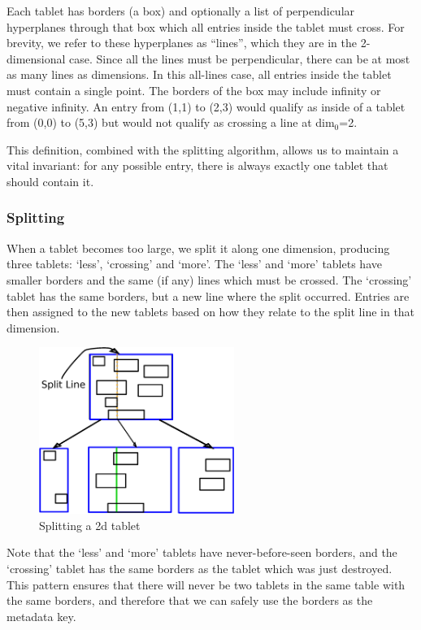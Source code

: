 \documentclass[11pt]{article}
\begin{document}
Each tablet has borders (a box) and optionally a list of perpendicular hyperplanes through that box which all entries inside the tablet must cross.  For brevity, we refer to these hyperplanes as ``lines'', which they are in the 2-dimensional case.   Since all the lines must be perpendicular, there can be at most as many lines as dimensions. In this all-lines case, all entries inside the tablet must contain a single point. The borders of the box may include infinity or negative infinity. An entry from (1,1) to (2,3) would qualify as inside of a tablet from (0,0) to (5,3) but would not qualify as crossing a line at dim$_0$=2.

This definition, combined with the splitting algorithm, allows us to maintain a vital invariant: for any possible entry, there is always exactly one tablet that should contain it.

\subsubsection{Splitting}

When a tablet becomes too large, we split it along one dimension, producing three tablets: `less', `crossing' and `more'. The `less' and `more' tablets have smaller borders and the same (if any) lines which must be crossed. The `crossing' tablet has the same borders, but a new line where the split occurred. Entries are then assigned to the new tablets based on how they relate to the split line in that dimension.

\begin{figure}[h]
\centering
\includegraphics[width=2.5in]{tabsplit}
\caption{Splitting a 2d tablet}
\label{fig:split}
\end{figure}

Note that the `less' and `more' tablets have never-before-seen borders, and the `crossing' tablet has the same borders as the tablet which was just destroyed. This pattern ensures that there will never be two tablets in the same table with the same borders, and therefore that we can safely use the borders as the metadata key.
\end{document}
